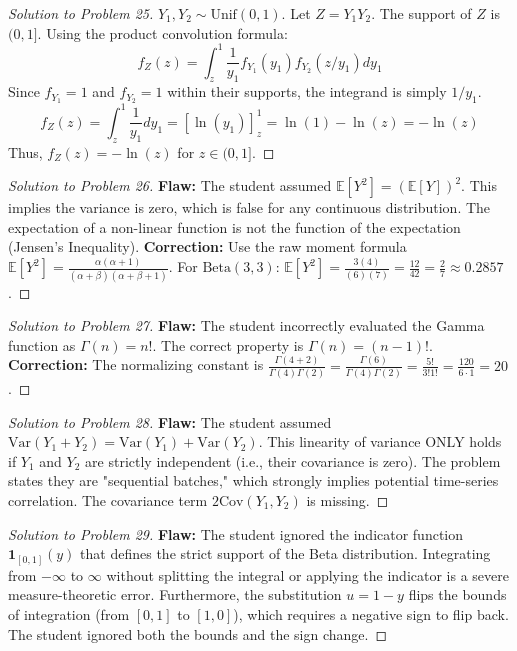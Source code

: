 \documentclass[11pt, a4paper]{article}
\theoremstyle{definition}
\theoremstyle{remark}
\newcommand{\E}{\mathbb{E}}
\begin{document}
\begin{proof}[Solution to Problem 25]
$Y_1, Y_2 \sim \text{Unif}(0, 1)$. Let $Z = Y_1 Y_2$. The support of $Z$ is $(0, 1]$.
Using the product convolution formula:
\[
f_Z(z) = \int_z^1 \frac{1}{y_1} f_{Y_1}(y_1) f_{Y_2}(z/y_1) dy_1
\]
Since $f_{Y_1} = 1$ and $f_{Y_2} = 1$ within their supports, the integrand is simply $1/y_1$.
\[
f_Z(z) = \int_z^1 \frac{1}{y_1} dy_1 = \left[ \ln(y_1) \right]_z^1 = \ln(1) - \ln(z) = -\ln(z)
\]
Thus, $f_Z(z) = -\ln(z)$ for $z \in (0, 1]$.
\end{proof}

\begin{proof}[Solution to Problem 26]
\textbf{Flaw:} The student assumed $\E[Y^2] = (\E[Y])^2$. This implies the variance is zero, which is false for any continuous distribution. The expectation of a non-linear function is not the function of the expectation (Jensen's Inequality).
\textbf{Correction:} Use the raw moment formula $\E[Y^2] = \frac{\alpha(\alpha+1)}{(\alpha+\beta)(\alpha+\beta+1)}$.
For $\text{Beta}(3, 3)$: $\E[Y^2] = \frac{3(4)}{(6)(7)} = \frac{12}{42} = \frac{2}{7} \approx 0.2857$.
\end{proof}

\begin{proof}[Solution to Problem 27]
\textbf{Flaw:} The student incorrectly evaluated the Gamma function as $\Gamma(n) = n!$. The correct property is $\Gamma(n) = (n-1)!$.
\textbf{Correction:} The normalizing constant is $\frac{\Gamma(4+2)}{\Gamma(4)\Gamma(2)} = \frac{\Gamma(6)}{\Gamma(4)\Gamma(2)} = \frac{5!}{3!1!} = \frac{120}{6 \cdot 1} = 20$.
\end{proof}

\begin{proof}[Solution to Problem 28]
\textbf{Flaw:} The student assumed $\text{Var}(Y_1 + Y_2) = \text{Var}(Y_1) + \text{Var}(Y_2)$. This linearity of variance ONLY holds if $Y_1$ and $Y_2$ are strictly independent (i.e., their covariance is zero). The problem states they are "sequential batches," which strongly implies potential time-series correlation. The covariance term $2\text{Cov}(Y_1, Y_2)$ is missing.
\end{proof}

\begin{proof}[Solution to Problem 29]
\textbf{Flaw:} The student ignored the indicator function $\mathbf{1}_{[0,1]}(y)$ that defines the strict support of the Beta distribution. Integrating from $-\infty$ to $\infty$ without splitting the integral or applying the indicator is a severe measure-theoretic error. Furthermore, the substitution $u = 1-y$ flips the bounds of integration (from $[0, 1]$ to $[1, 0]$), which requires a negative sign to flip back. The student ignored both the bounds and the sign change.
\end{proof}
\end{document}
